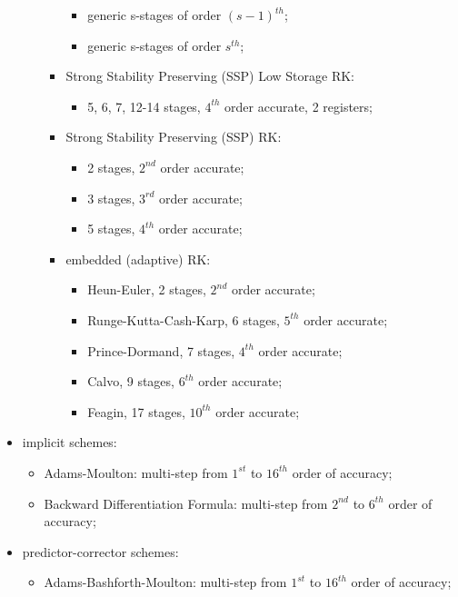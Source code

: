 \begin{itemize}
\begin{itemize}
\begin{itemize}
         \begin{itemize}
            \item generic s-stages of order $(s-1)^{th}$;
            \item generic s-stages of order $s^{th}$;
         \end{itemize}
         \item Strong Stability Preserving (SSP) Low Storage RK:
         \begin{itemize}
            \item 5, 6, 7, 12-14 stages, $4^{th}$ order accurate, 2 registers;
         \end{itemize}
         \item Strong Stability Preserving (SSP) RK:
         \begin{itemize}
            \item 2 stages, $2^{nd}$ order accurate;
            \item 3 stages, $3^{rd}$ order accurate;
            \item 5 stages, $4^{th}$ order accurate;
         \end{itemize}
         \item embedded (adaptive) RK:
         \begin{itemize}
            \item Heun-Euler, 2 stages, $2^{nd}$ order accurate;
            \item Runge-Kutta-Cash-Karp, 6 stages, $5^{th}$ order accurate;
            \item Prince-Dormand, 7 stages, $4^{th}$ order accurate;
            \item Calvo, 9 stages, $6^{th}$ order accurate;
            \item Feagin, 17 stages, $10^{th}$ order accurate;
         \end{itemize}
      \end{itemize}
   \end{itemize}
   \item implicit schemes:
   \begin{itemize}
      \item Adams-Moulton: multi-step from $1^{st}$ to $16^{th}$ order of accuracy;
      \item Backward Differentiation Formula: multi-step from $2^{nd}$ to $6^{th}$ order of accuracy;
   \end{itemize}
   \item predictor-corrector schemes:
   \begin{itemize}
      \item Adams-Bashforth-Moulton: multi-step from $1^{st}$ to $16^{th}$ order of accuracy;
   \end{itemize}
\end{itemize}

